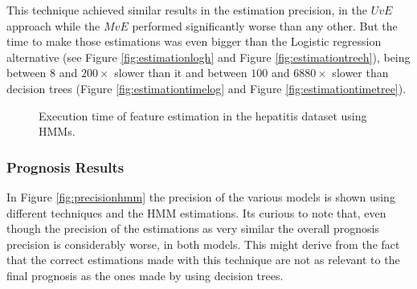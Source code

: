 This technique achieved similar results in the estimation precision, in the $UvE$ approach while the $MvE$ performed significantly worse than any other. But the time to make those estimations was even bigger than the Logistic regression alternative (see Figure \ref{fig:estimationlogh} and Figure \ref{fig:estimationtreeh}), being between $8$ and $200\times$ slower than it and between $100$ and $6880\times$ slower than decision trees (Figure \ref{fig:estimationtimelog} and Figure \ref{fig:estimationtimetree}).
 
 
\begin{figure}[h]
  \begin{subfigmatrix}{2}
  \end{subfigmatrix}
  \caption{Execution time of feature estimation in the hepatitis dataset using HMMs.}
  \label{fig:estimationtimehmm}
\end{figure}

\subsubsection{Prognosis Results}
\label{subsubsection:prognosis_hmm}

In Figure \ref{fig:precisionhmm} the precision of the various models is shown using different techniques and the HMM estimations. Its curious to note
that, even though the precision of the estimations as very similar the overall prognosis precision is considerably worse, in both models. This might derive from the fact that the correct estimations made with this technique are not as relevant to the final prognosis as the ones made by using decision trees. 

